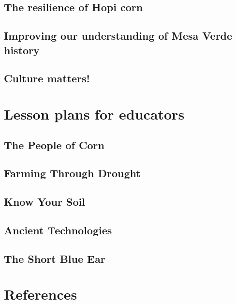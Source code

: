 \documentclass[12pt,]{krantz}
\begin{document}
\hypertarget{the-resilience-of-hopi-corn}{%
\section{The resilience of Hopi
corn}\label{the-resilience-of-hopi-corn}}

\hypertarget{improving-our-understanding-of-mesa-verde-history}{%
\section{Improving our understanding of Mesa Verde
history}\label{improving-our-understanding-of-mesa-verde-history}}

\hypertarget{culture-matters}{%
\section{Culture matters!}\label{culture-matters}}

\hypertarget{lesson-plans-for-educators}{%
\chapter{Lesson plans for educators}\label{lesson-plans-for-educators}}

\hypertarget{the-people-of-corn-1}{%
\section{The People of Corn}\label{the-people-of-corn-1}}

\hypertarget{farming-through-drought}{%
\section{Farming Through Drought}\label{farming-through-drought}}

\hypertarget{know-your-soil}{%
\section{Know Your Soil}\label{know-your-soil}}

\hypertarget{ancient-technologies}{%
\section{Ancient Technologies}\label{ancient-technologies}}

\hypertarget{the-short-blue-ear}{%
\section{The Short Blue Ear}\label{the-short-blue-ear}}

\hypertarget{references}{%
\chapter*{References}\label{references}}




\backmatter
\printindex
\end{document}
